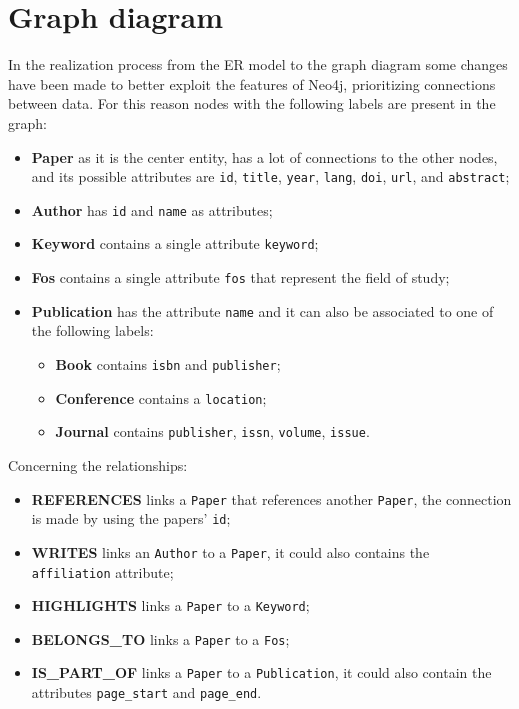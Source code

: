 \chapter{Graph diagram}
\label{ch:graph_diagram}%
In the realization process from the ER model to the graph diagram some changes have been made to better exploit the features of Neo4j, prioritizing connections between data.
For this reason nodes with the following labels are present in the graph:
\begin{itemize}
    \item \textbf{Paper} as it is the center entity, has a lot of connections to the other nodes, and its possible attributes are \verb|id|, \verb|title|, \verb|year|, \verb|lang|, \verb|doi|, \verb|url|, and \verb|abstract|;
    \item \textbf{Author} has \verb|id| and \verb|name| as attributes;
    \item \textbf{Keyword} contains a single attribute \verb|keyword|;
    \item \textbf{Fos} contains a single attribute \verb|fos| that represent the field of study;
    \item \textbf{Publication} has the attribute \verb|name| and it can also be associated to one of the following labels:
    \begin{itemize}
        \item \textbf{Book} contains \verb|isbn| and \verb|publisher|;
        \item \textbf{Conference} contains a \verb|location|;
        \item \textbf{Journal} contains \verb|publisher|, \verb|issn|, \verb|volume|, \verb|issue|.
    \end{itemize}
\end{itemize}
Concerning the relationships:
\begin{itemize}
    \item \textbf{REFERENCES} links a \verb|Paper| that references another \verb|Paper|, the connection is made by using the papers' \verb|id|;
    \item \textbf{WRITES} links an \verb|Author| to a \verb|Paper|, it could also contains the \verb|affiliation| attribute;
    \item \textbf{HIGHLIGHTS} links a \verb|Paper| to a \verb|Keyword|;
    \item \textbf{BELONGS\_TO} links a \verb|Paper| to a \verb|Fos|;
    \item \textbf{IS\_PART\_OF} links a \verb|Paper| to a \verb|Publication|, it could also contain the attributes \verb|page_start| and \verb|page_end|.
\end{itemize}


